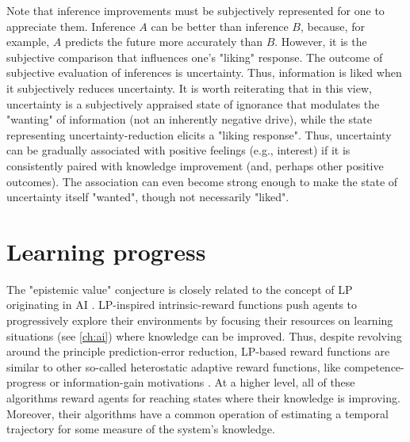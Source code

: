 Note that inference improvements must be subjectively represented for one to appreciate them. Inference $A$ can be better than inference $B$, because, for example, $A$ predicts the future more accurately than $B$. However, it is the subjective comparison that influences one's "liking" response. The outcome of subjective evaluation of inferences is uncertainty. Thus, information is liked when it subjectively reduces uncertainty. It is worth reiterating that in this view, uncertainty is a subjectively appraised state of ignorance that modulates the "wanting" of information (not an inherently negative drive), while the state representing uncertainty-reduction elicits a "liking response". Thus, uncertainty can be gradually associated with positive feelings (e.g., interest) if it is consistently paired with knowledge improvement (and, perhaps other positive outcomes). The association can even become strong enough to make the state of uncertainty itself "wanted", though not necessarily "liked".

\section{Learning progress}

The "epistemic value" conjecture is closely related to the concept of \ac{LP} originating in \ac{AI} \cite[e.g., ][]{schmidhuber_curious_1991,oudeyer_intrinsic_2007}. \ac{LP}-inspired intrinsic-reward functions push agents to progressively explore their environments by focusing their resources on learning situations (see \autoref{ch:ai}) where knowledge can be improved. Thus, despite revolving around the principle prediction-error reduction, \ac{LP}-based reward functions are similar to other so-called heterostatic adaptive reward functions, like competence-progress or information-gain motivations \cite{oudeyer_what_2007}. At a higher level, all of these algorithms reward agents for reaching states where their knowledge is improving. Moreover, their algorithms have a common operation of estimating a temporal trajectory for some measure of the system's knowledge. 


